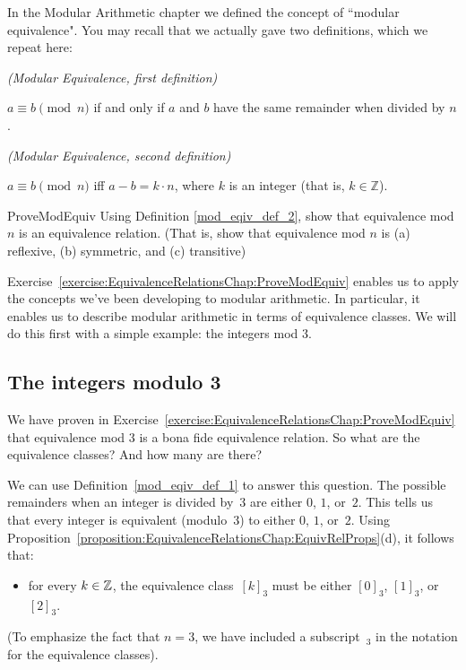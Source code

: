 In the Modular Arithmetic chapter we defined the concept of ``modular equivalence".  You may recall that we actually gave two definitions, which we repeat here: 

\begin{defn}\label{mod_eqiv_def_1} \emph{(Modular Equivalence, first definition)}

\medskip
$a \equiv b \pmod{n}$ if and only if $a$ and $b$ have the same remainder when divided by $n$.
\end{defn}



\begin{defn}\label{mod_eqiv_def_2} \emph{(Modular Equivalence, second definition)}

\medskip
$a \equiv b \pmod{n}$ iff $a - b = k \cdot n$, where $k$ is an integer (that is, $k \in  {\mathbb Z}$). 
\end{defn}

\begin{exercise}{ProveModEquiv}
Using  Definition  \ref{mod_eqiv_def_2}, show that equivalence mod $n$ is an equivalence relation. (That is, show that equivalence mod $n$ is (a) reflexive, (b) symmetric, and (c) transitive)
\end{exercise}

Exercise~\ref{exercise:EquivalenceRelationsChap:ProveModEquiv} enables us to apply the concepts we've been developing to modular arithmetic. In particular, it enables us to describe modular arithmetic in terms of equivalence classes. We will do this first with a simple example: the integers mod 3.

\subsection{The integers modulo 3}\label{sec:intMod3}

We have proven in Exercise~\ref{exercise:EquivalenceRelationsChap:ProveModEquiv} that equivalence mod 3 is a bona fide equivalence relation. So what are the equivalence classes? And how many are there?
\medskip

We can use Definition~\ref{mod_eqiv_def_1} to answer this question. The possible remainders when an integer is divided by~$3$ are either $0$, $1$, or~$2$. This tells us that  every integer is equivalent (modulo~$3$) to either $0$, $1$, or~$2$. Using Proposition~\ref{proposition:EquivalenceRelationsChap:EquivRelProps}(d), it follows that:
\begin{itemize}
\item[] for every $k \in \mathbb{Z}$, the equivalence class~$[k]_3$ must be either $[0]_3$, $[1]_3$, or~$[2]_3$.
\end{itemize}
(To emphasize the fact that $n = 3$, we have included a subscript~${}_3$ in the notation for the equivalence classes).


